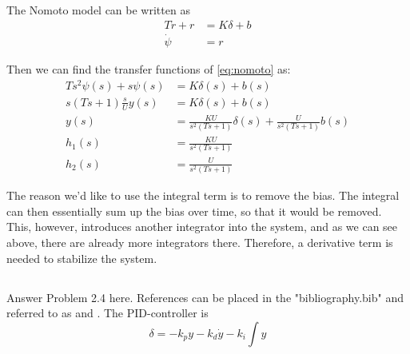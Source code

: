 The Nomoto model can be written as
\begin{equation}
\label{eq:nomoto}
	\begin{aligned}
		T \dot{r} + r &= K \delta + b \\
		\dot{\psi} &= r
	\end{aligned}
\end{equation}

Then we can find the transfer functions of \eqref{eq:nomoto} as: 
\begin{align*}
	T s^2 \psi(s) + s \psi(s) &= K \delta(s) + b(s) \\
	s(T s + 1) \frac{s}{U} y(s) &= K \delta(s) + b(s) \\
	y(s) &= \frac{K U}{s^2 (T s + 1)} \delta(s) + \frac{U}{s^2 (T s + 1)} b(s) \\ 
	h_1(s) &= \frac{K U}{s^2 (T s + 1)} \\
	h_2(s) &= \frac{U}{s^2 (T s + 1)}
\end{align*}

The reason we'd like to use the integral term is to remove the bias. The integral can then essentially sum up the bias over time, so that it would be removed. This, however, introduces another integrator into the system, and as we can see above, there are already more integrators there. Therefore, a derivative term is needed to stabilize the system. 

\subsection{}
Answer Problem 2.4 here.  References can be placed in the "bibliography.bib" and referred to as \cite{Fossen2011} and \cite{Fjellstad1994857}. The PID-controller is
\begin{equation}
	\delta = -k_p y - k_d \dot{y} - k_i \int y
\end{equation}
